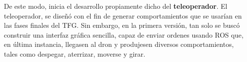 De este modo, inicia el desarrollo propiamente dicho del \textbf{teleoperador}. El teleoperador, se diseñó con el fin de generar comportamientos que se usarían en las fases finales del \ac{TFG}. Sin embargo, en la primera versión, tan solo se buscó construir una interfaz gráfica sencilla, capaz de enviar ordenes usando \ac{ROS} que, en última instancia, llegasen al dron y produjesen diversos comportamientos, tales como despegar, aterrizar, moverse y girar.\\